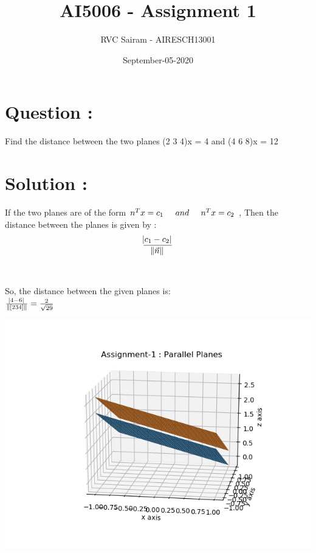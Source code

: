 \documentclass{article}
\title{AI5006 - Assignment 1}
\author{RVC Sairam - AIRESCH13001 }
\date{September-05-2020}
\begin{document}
\maketitle
\section*{Question :}
\large{Find the distance between the two planes
(2 3 4)x = 4 and (4 6 8)x = 12}
\section*{Solution :}
\large{If the two planes are of the form \( n^T x = c_1 \hspace{0.5cm}and \hspace{0.5cm} n^T x = c_2 \) , Then the distance between the planes is given by : }\\

\[\frac{\abs{c_1-c_2}}{\norm{\vec{n}}}\] \\ \\

\large{So, the distance between the given planes is: }\\

\large{\(\frac{\abs{4 - 6}}{\lVert [2 3 4]\rVert}   =   \frac{2}{\sqrt{29}}\)  } 

\begin{center}
    \includegraphics[width = .6\textwidth]{parallel planes.png}
\end{center}
\end{document}
